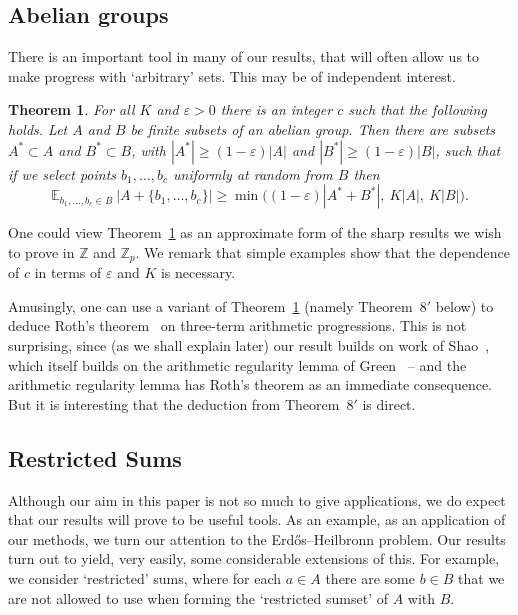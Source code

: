 \documentclass[12pt,reqno]{amsart}
\newtheorem{theorem}{Theorem}
\theoremstyle{definition}
\renewcommand\geq{\geqslant}
\renewcommand\ge{\geqslant}
\begin{document}
\vspace{10pt}
\subsection{Abelian groups}
There is an important tool in many of our results, that will
often allow us to make progress with `arbitrary' sets. This may be of independent
interest.

\begin{theorem}\label{implication_shao1-prov}
For all $K$ and $\varepsilon >0$ there is an integer $c$ such that the following holds.
Let $A$ and $B$ be finite subsets of an abelian group. Then there are subsets $A^* \subset A$
and $B^* \subset B$, with $|A^*|\ge (1-\varepsilon)|A|$ and
$|B^*|\ge (1-\varepsilon)|B|$, such that if we select points $b_1,\hdots,b_c$ uniformly at random from
$B$ then
\[
{\mathbb E}_{b_1,  \dots , b_c\in B}\ |A+\{b_1, \dots , b_c\}|
\geq \min\big((1-\varepsilon)|A^*+ B^*|,\ K |A|,\ K |B| \big).
\]
\end{theorem}


\vspace{5pt}
One could view Theorem~\ref{implication_shao1-prov} as an approximate form of the sharp results we wish to prove in
${\mathbb Z}$ and ${\mathbb Z}_p$.
We remark that simple examples show that
the dependence of $c$ in terms of $\varepsilon$ and $K$ is necessary.

\vspace{5pt}
Amusingly, one can use a variant of Theorem~\ref{implication_shao1-prov} (namely
Theorem~$8'$ below)
to deduce Roth's theorem~\cite{Roth}
on three-term arithmetic
progressions. This is not surprising, since (as we shall explain later) our result builds
on work of Shao~\cite{shao}, which itself builds on the arithmetic regularity lemma of
Green~\cite{green} -- and the
arithmetic regularity lemma has Roth's theorem as an immediate consequence. But it is interesting that
the deduction from Theorem~$8'$ is direct.



\vspace{10pt}
\subsection{Restricted Sums}
Although our aim in this paper is not so much to give applications, we do expect that our results will
prove to be useful tools. As an example, as an application of our methods, we turn our attention to the Erd\H{o}s--Heilbronn problem.
Our results turn out to yield, very easily, some considerable extensions of this. For example, we consider
`restricted' sums, where for each $a \in A$ there are some $b \in B$ that we are
not allowed to use when forming the `restricted sumset' of $A$ with $B$.
\end{document}
